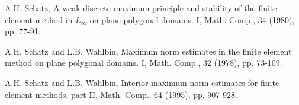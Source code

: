 \documentclass[1996/10/24]{amsart}
\theoremstyle{definition}
\numberwithin{equation}{section}
\begin{document}
\begin{thebibliography}{}
A.H. Schatz, A weak discrete maximum principle and stability of the finite element method in $L_{\infty}$ on plane polygonal domains. I, Math. Comp.,
34 (1980), pp. 77-91.

A.H. Schatz and L.B. Wahlbin, Maximum norm estimates in the finite element method on plane polygonal domains. I, Math. Comp., 32 (1978), pp. 73-109.

A.H. Schatz and L.B. Wahlbin, Interior maximum-norm estimates for finite element methods, part II, Math. Comp., 64 (1995), pp. 907-928.

\end{thebibliography}
\end{document}
